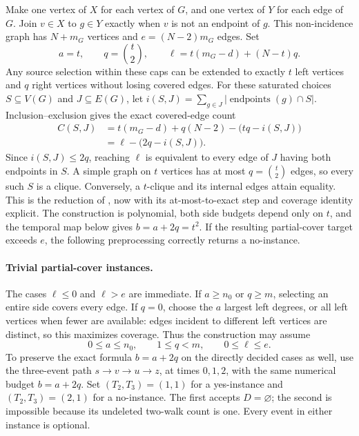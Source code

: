 Make one vertex of \(X\) for each vertex of \(G\), and one vertex of
\(Y\) for each edge of \(G\). Join \(v\in X\) to \(g\in Y\) exactly
when \(v\) is not an endpoint of \(g\). This non-incidence graph has
\(N+m_G\) vertices and \(e=(N-2)m_G\) edges. Set
\[
 a=t,\qquad q=\binom{t}{2},\qquad
 \ell=t(m_G-d)+(N-t)q.
\]
Any source selection within these caps can be extended to exactly
\(t\) left vertices and \(q\) right vertices without losing covered
edges. For these saturated choices \(S\subseteq V(G)\) and
\(J\subseteq E(G)\), let
\(i(S,J)=\sum_{g\in J}|\operatorname{endpoints}(g)\cap S|\).
Inclusion--exclusion gives the exact covered-edge count
\begin{equation}
\label{hard:clique-coverage}
\begin{aligned}
 C(S,J)
 &=t(m_G-d)+q(N-2)-\bigl(tq-i(S,J)\bigr)\\
 &=\ell-\bigl(2q-i(S,J)\bigr).
\end{aligned}
\end{equation}
Since \(i(S,J)\le2q\), reaching \(\ell\) is equivalent to every edge
of \(J\) having both endpoints in \(S\). A simple graph on \(t\)
vertices has at most \(q=\binom{t}{2}\) edges, so every such \(S\) is a
clique. Conversely, a \(t\)-clique and its internal
edges attain equality. This is the reduction of
\cite[Theorem~10]{mkrtchyan2024}, now with its at-most-to-exact step and
coverage identity explicit. The construction is polynomial, both side
budgets depend only on \(t\), and the temporal map below gives
\(b=a+2q=t^2\). If the resulting partial-cover target exceeds \(e\),
the following preprocessing correctly returns a no-instance.

\paragraph{Trivial partial-cover instances.}
The cases \(\ell\le0\) and \(\ell>e\) are immediate. If \(a\ge n_0\) or
\(q\ge m\), selecting an entire side covers every edge. If \(q=0\), choose
the \(a\) largest left degrees, or all left vertices when fewer are
available: edges incident to different left vertices are distinct, so this
maximizes coverage. Thus the construction may assume
\begin{equation}
\label{hard:source-range}
 0\le a\le n_0,\qquad 1\le q<m,\qquad 0\le\ell\le e.
\end{equation}
To preserve the exact formula \(b=a+2q\) on the directly decided cases as
well, use the three-event path
\(s\mathbin{\to}v\mathbin{\to}u\mathbin{\to}z\), at times \(0,1,2\),
with the same numerical budget \(b=a+2q\). Set \((T_2,T_3)=(1,1)\)
for a yes-instance and \((T_2,T_3)=(2,1)\) for a no-instance.
The first accepts \(D=\varnothing\); the second is impossible because its
undeleted two-walk count is one. Every event in either instance is
optional.

